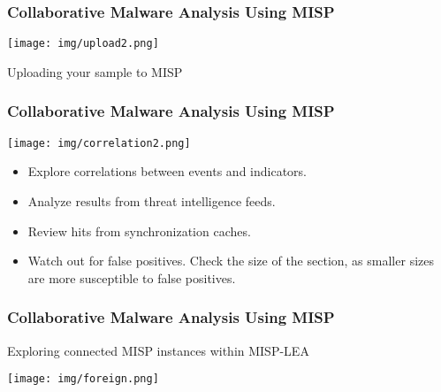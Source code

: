 \begin{frame}
\frametitle{Collaborative Malware Analysis Using MISP}

\centering
\texttt{[image: img/upload2.png]}

Uploading your sample to MISP

\end{frame}

\begin{frame}
\frametitle{Collaborative Malware Analysis Using MISP}

\centering
\texttt{[image: img/correlation2.png]}

\begin{itemize}
    \item Explore correlations between events and indicators.
    \item Analyze results from threat intelligence feeds.
    \item Review hits from synchronization caches.
    \item Watch out for false positives. Check the size of the section, as smaller sizes are more susceptible to false positives.
\end{itemize}

\end{frame}

\begin{frame}
\frametitle{Collaborative Malware Analysis Using MISP}

Exploring connected MISP instances within MISP-LEA

\centering
\texttt{[image: img/foreign.png]}

\end{frame}

